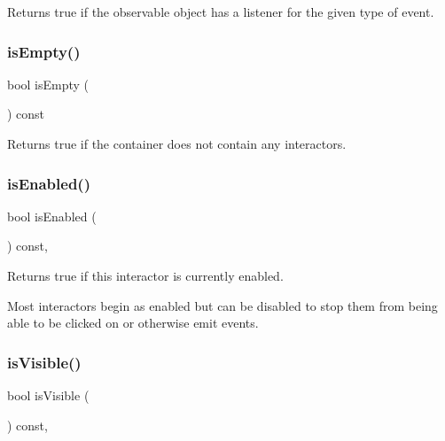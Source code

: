 Returns true if the observable object has a listener for the given type of event. 

\mbox{\label{classGContainer_acf82f9b2937375c7b1cf3dccb3df3312}} 
\subsubsection{\texorpdfstring{is\+Empty()}{isEmpty()}}
{\footnotesize\ttfamily bool is\+Empty (\begin{DoxyParamCaption}{ }\end{DoxyParamCaption}) const\hspace{0.3cm}{\ttfamily [virtual]}}



Returns true if the container does not contain any interactors. 

\mbox{\label{classGInteractor_aacb819fb241851fd9fc045271baa4034}} 
\subsubsection{\texorpdfstring{is\+Enabled()}{isEnabled()}}
{\footnotesize\ttfamily bool is\+Enabled (\begin{DoxyParamCaption}{ }\end{DoxyParamCaption}) const\hspace{0.3cm}{\ttfamily [virtual]}, {\ttfamily [inherited]}}



Returns true if this interactor is currently enabled. 

Most interactors begin as enabled but can be disabled to stop them from being able to be clicked on or otherwise emit events. \mbox{\label{classGInteractor_a9d8a6cfb13917785c143e74d40e4e2be}} 
\subsubsection{\texorpdfstring{is\+Visible()}{isVisible()}}
{\footnotesize\ttfamily bool is\+Visible (\begin{DoxyParamCaption}{ }\end{DoxyParamCaption}) const\hspace{0.3cm}{\ttfamily [virtual]}, {\ttfamily [inherited]}}



